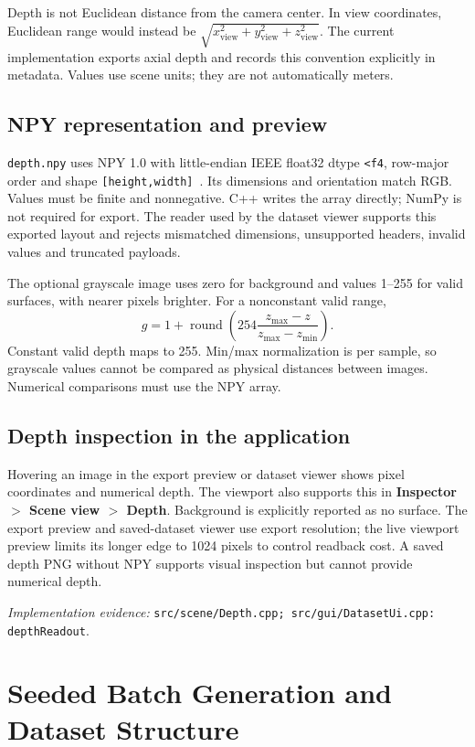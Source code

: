 \documentclass[12pt,a4paper]{article}
\newcommand{\code}[1]{{\small\nolinkurl{#1}}}
\newcommand{\source}[1]{\par{\raggedright\footnotesize\textit{Implementation evidence:} \code{#1}.\par}}
\begin{document}
Depth is not Euclidean distance from the camera center. In view coordinates, Euclidean range would instead be $\sqrt{x_{\mathrm{view}}^2+y_{\mathrm{view}}^2+z_{\mathrm{view}}^2}$. The current implementation exports axial depth and records this convention explicitly in metadata. Values use scene units; they are not automatically meters.

\subsection{NPY representation and preview}
\code{depth.npy} uses NPY 1.0 with little-endian IEEE float32 dtype \code{<f4}, row-major order and shape \code{[height,width]}~\cite{npy}. Its dimensions and orientation match RGB. Values must be finite and nonnegative. C++ writes the array directly; NumPy is not required for export. The reader used by the dataset viewer supports this exported layout and rejects mismatched dimensions, unsupported headers, invalid values and truncated payloads.

The optional grayscale image uses zero for background and values 1--255 for valid surfaces, with nearer pixels brighter. For a nonconstant valid range,
\begin{equation}
g=1+\operatorname{round}\!\left(254\frac{z_{\max}-z}{z_{\max}-z_{\min}}\right).
\end{equation}
Constant valid depth maps to 255. Min/max normalization is per sample, so grayscale values cannot be compared as physical distances between images. Numerical comparisons must use the NPY array.

\subsection{Depth inspection in the application}
Hovering an image in the export preview or dataset viewer shows pixel coordinates and numerical depth. The viewport also supports this in \textbf{Inspector $>$ Scene view $>$ Depth}. Background is explicitly reported as no surface. The export preview and saved-dataset viewer use export resolution; the live viewport preview limits its longer edge to 1024 pixels to control readback cost. A saved depth PNG without NPY supports visual inspection but cannot provide numerical depth.
\source{src/scene/Depth.cpp; src/gui/DatasetUi.cpp: depthReadout}

\section{Seeded Batch Generation and Dataset Structure}
\end{document}
